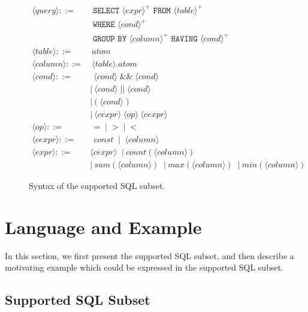 \newcommand{\q}{\langle query\rangle}
\newcommand{\db}{\langle db\rangle}
\newcommand{\pat}{\langle pat\rangle}
\newcommand{\bug}{\langle bug\rangle}
\newcommand{\dist}{\langle distance\rangle}
\newcommand{\sem}[1]{\llbracket #1\rrbracket}
\newcommand{\lit}[1]{\texttt{#1}}

\newcommand{\column}{\langle column\rangle}
\newcommand{\dbtable}{\langle table\rangle}
\newcommand{\cond}{\langle cond\rangle}
\newcommand{\op}{\langle op\rangle}
\newcommand{\e}{\langle expr\rangle}
\newcommand{\ce}{\langle cexpr\rangle}

\begin{figure}[t]
\footnotesize%
\begin{align*}
\q ::= {} 
	& \texttt{ SELECT } \e^+ \texttt{ FROM } \dbtable^+ \\
        & \texttt{ WHERE } \cond^+ \\ 
	&  \texttt{ GROUP BY } \column^+ \texttt{ HAVING } \cond^+\\
\dbtable::= {} &\ atom \\
\column ::= {} &\ \dbtable.atom\\
\cond ::= {} &\ \ \cond \;\texttt{\&\&}\; \cond \\ 
    & |\ \cond \;\texttt{||}\; \cond \\
    & |\ \texttt{(}\;\cond\;\texttt{)} \\
    & |\ \ce \;\op\; \ce \\
\op ::= {} &\ \ \texttt{=} \;\;|\;\; \texttt{>}  \;\;|\;\; \texttt{<}\\
\ce ::= {} &\ \ const \;\;|\;\; \column  \;\; \\
\e ::= {} & \ce \;\;|\ count(\column) \\
    & |\ sum(\column) \;\;|\ max(\column) \;\;|\ min(\column) 
\end{align*}
\normalsize%
\caption{Syntax of the supported SQL subset.}
\label{fig:syntax}
\end{figure}


\section{Language and Example}
\label{sec:langsubset}

In this section, we first present the supported SQL subset, and
then describe a motivating example which could be expressed in the
supported SQL subset.

\subsection{Supported SQL Subset}

